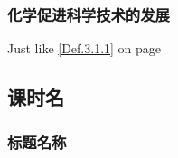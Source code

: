 \documentclass[color=BLUE]{textbook-cn}%
\begin{document}
\begin{Paracol}
\begin{Proof}
\lipsum[1]
\end{Proof}




\begin{Lemma}[引理名称]
\zhlipsum[2]
\end{Lemma}


\begin{Proposition}[命题名称命题名称命题名称命题名称命题名称]
\zhlipsum[2]
\end{Proposition}

\begin{Warning}
\lipsum[1][1-3]
\end{Warning}


\subsubsection{化学促进科学技术的发展}

\lipsum[1-2]




\Answer{\lipsum[1][1-7]}




\begin{Definition}[定义名称]
\lipsum[1][1-3]
\end{Definition}

Just like \ref{Def.3.1.1} on page \pageref{Def.3.1.1}





\begin{Link}
\zhlipsum
\end{Link}



\lipsum[2]

\begin{Practice}
\lipsum[1][1-5]
\end{Practice}


\subsection{课时名}
\lipsum[3]

\subsubsection{标题名称}
\lipsum[1]


\end{Paracol}
\end{document}

